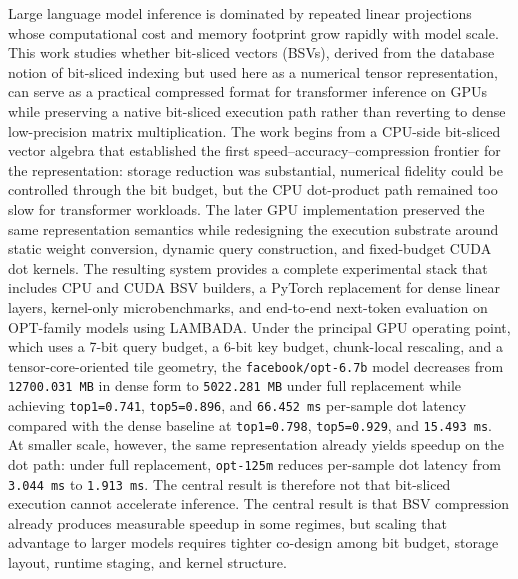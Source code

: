 Large language model inference is dominated by repeated linear projections whose computational cost and memory footprint grow rapidly with model scale. This work studies whether bit-sliced vectors (BSVs), derived from the database notion of bit-sliced indexing but used here as a numerical tensor representation, can serve as a practical compressed format for transformer inference on GPUs while preserving a native bit-sliced execution path rather than reverting to dense low-precision matrix multiplication. The work begins from a CPU-side bit-sliced vector algebra that established the first speed--accuracy--compression frontier for the representation: storage reduction was substantial, numerical fidelity could be controlled through the bit budget, but the CPU dot-product path remained too slow for transformer workloads. The later GPU implementation preserved the same representation semantics while redesigning the execution substrate around static weight conversion, dynamic query construction, and fixed-budget CUDA dot kernels. The resulting system provides a complete experimental stack that includes CPU and CUDA BSV builders, a PyTorch replacement for dense linear layers, kernel-only microbenchmarks, and end-to-end next-token evaluation on OPT-family models using LAMBADA. Under the principal GPU operating point, which uses a 7-bit query budget, a 6-bit key budget, chunk-local rescaling, and a tensor-core-oriented tile geometry, the \texttt{facebook/opt-6.7b} model decreases from \texttt{12700.031 MB} in dense form to \texttt{5022.281 MB} under full replacement while achieving \texttt{top1=0.741}, \texttt{top5=0.896}, and \texttt{66.452 ms} per-sample dot latency compared with the dense baseline at \texttt{top1=0.798}, \texttt{top5=0.929}, and \texttt{15.493 ms}. At smaller scale, however, the same representation already yields speedup on the dot path: under full replacement, \texttt{opt-125m} reduces per-sample dot latency from \texttt{3.044 ms} to \texttt{1.913 ms}. The central result is therefore not that bit-sliced execution cannot accelerate inference. The central result is that BSV compression already produces measurable speedup in some regimes, but scaling that advantage to larger models requires tighter co-design among bit budget, storage layout, runtime staging, and kernel structure.
